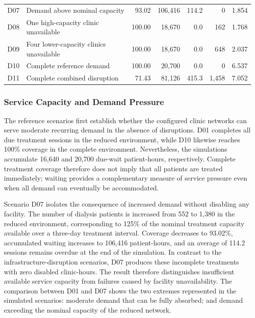 \begin{table}[ht]
\begin{tabularx}{\linewidth}{
    @{}
    l
    >{\raggedright\arraybackslash}X
    rrrrr
    @{}
}
D07 & Demand above nominal capacity
    &  93.02 & 106,416 & 114.2 &     0 & 1.854 \\

D08 & One high-capacity clinic unavailable
    & 100.00 & 18,670 &   0.0 &   162 & 1.768 \\

D09 & Four lower-capacity clinics unavailable
    & 100.00 & 18,670 &   0.0 &   648 & 2.037 \\

D10 & Complete reference demand
    & 100.00 & 20,700 &   0.0 &     0 & 6.537 \\

D11 & Complete combined disruption
    &  71.43 & 81,126 & 415.3 & 1,458 & 7.052 \\

\bottomrule
\end{tabularx}
\end{table}

\subsubsection{Service Capacity and Demand Pressure}
\label{sec:results_dialysis_capacity}

The reference scenarios first establish whether the configured clinic networks can serve moderate recurring demand in the absence of disruptions. D01 completes all due treatment sessions in the reduced environment, while D10 likewise reaches 100\% coverage in the complete environment. Nevertheless, the simulations accumulate 16,640 and 20,700 due-wait patient-hours, respectively. Complete treatment coverage therefore does not imply that all patients are treated immediately; waiting provides a complementary measure of service pressure even when all demand can eventually be accommodated.

Scenario D07 isolates the consequence of increased demand without disabling any facility. The number of dialysis patients is increased from 552 to 1,380 in the reduced environment, corresponding to 125\% of the nominal treatment capacity available over a three-day treatment interval. Coverage decreases to 93.02\%, accumulated waiting increases to 106,416 patient-hours, and an average of 114.2 sessions remains overdue at the end of the simulation. In contrast to the infrastructure-disruption scenarios, D07 produces these incomplete treatments with zero disabled clinic-hours. The result therefore distinguishes insufficient available service capacity from failures caused by facility unavailability.
The comparison between D01 and D07 shows the two extremes represented in the simulated scenarios: moderate demand that can be fully absorbed; and demand exceeding the nominal capacity of the reduced network. 

